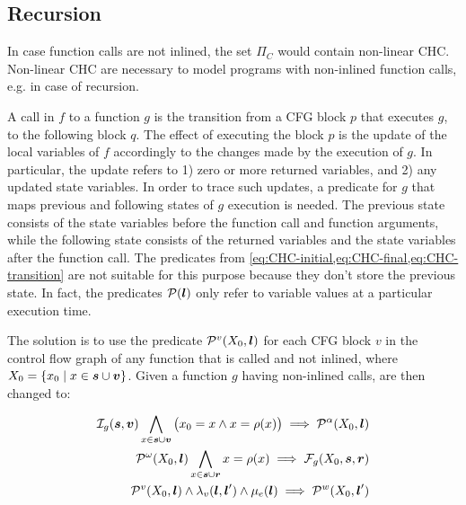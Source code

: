 \subsection{Recursion}
In case function calls are not inlined, 
the set $\Pi_C$ would contain non-linear CHC.
Non-linear CHC are necessary to model programs with
non-inlined function calls, e.g. in case of recursion.

A call in $f$ to a function $g$ is the transition
from a CFG block $p$ that executes $g$, to the
following block $q$. 
The effect of executing the block $p$ is the update of the local 
variables of $f$ accordingly to the changes
made by the execution of $g$. In particular,
the update refers to
1) zero or more returned variables,
and 2) any updated state variables.
In order to trace such updates, a predicate for $g$ that maps
previous and following states of $g$ execution is needed.
The previous state consists of the state variables
before the function call and
function arguments, while the following state consists
of the returned variables and the state variables after
the function call.
%
The predicates from 
\cref{eq:CHC-initial,eq:CHC-final,eq:CHC-transition}
are not suitable for this purpose because they don't store 
the previous state. In fact, the predicates $\mathcal{P}(\boldsymbol{l})$
only refer to variable values at a particular execution
time. 

The solution is to use the predicate 
$\mathcal{P}^v(X_0,\boldsymbol{l})$ for each CFG block $v$ in the
control flow graph of any function that is called and not inlined,
where \mbox{$X_0=\{x_0\mid x\in\boldsymbol{s}\cup\boldsymbol{v}\}$}.
Given a function $g$ having non-inlined calls,
 are then
changed to:

\begin{align}
\label{eq:CHC-nl-initial}
\inP_g(\svar,\farg)\bigwedge_{x\in\svar\cup\farg}\big(x_0=x\wedge x=\rho(x)\big)\implies\pred^\alpha(X_0,\lvar)\\
\label{eq:CHC-nl-final}
\pred^\omega(X_0,\lvar)\bigwedge_{x\in\svar\cup\rvar}x=\rho(x)\implies\finP_g(X_0,\svar,\rvar)\\
\label{eq:CHC-nl-transition}
\pred^v(X_0,\lvar)\wedge\lambda_v(\lvar,\lvar')\wedge\mu_e(\lvar)\implies\pred^w(X_0,\lvar')	
\end{align}


